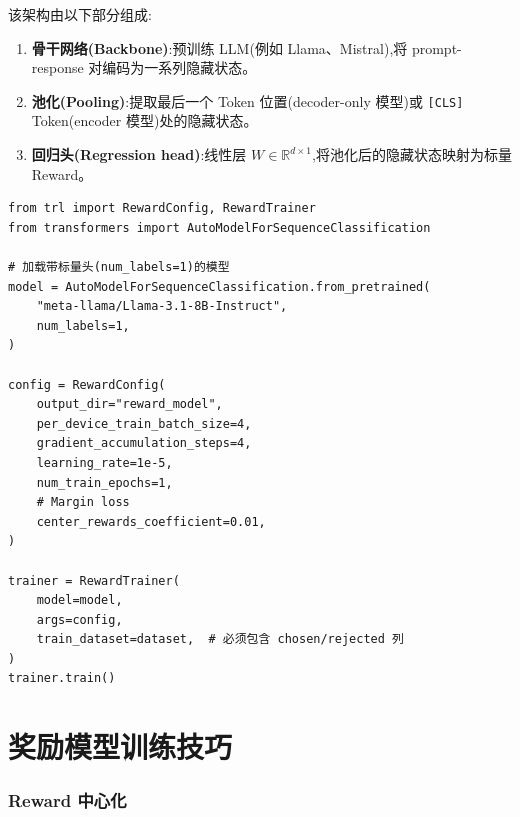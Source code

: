 该架构由以下部分组成:

\begin{enumerate}
  \item \textbf{骨干网络(Backbone)}:预训练 LLM(例如 Llama、Mistral),将 prompt-response 对编码为一系列隐藏状态。
  \item \textbf{池化(Pooling)}:提取最后一个 Token 位置(decoder-only 模型)或 \texttt{[CLS]} Token(encoder 模型)处的隐藏状态。
  \item \textbf{回归头(Regression head)}:线性层 $W \in \mathbb{R}^{d \times 1}$,将池化后的隐藏状态映射为标量 Reward。
\end{enumerate}

\begin{examplebox}
\begin{lstlisting}[style=pythonstyle]
from trl import RewardConfig, RewardTrainer
from transformers import AutoModelForSequenceClassification

# 加载带标量头(num_labels=1)的模型
model = AutoModelForSequenceClassification.from_pretrained(
    "meta-llama/Llama-3.1-8B-Instruct",
    num_labels=1,
)

config = RewardConfig(
    output_dir="reward_model",
    per_device_train_batch_size=4,
    gradient_accumulation_steps=4,
    learning_rate=1e-5,
    num_train_epochs=1,
    # Margin loss
    center_rewards_coefficient=0.01,
)

trainer = RewardTrainer(
    model=model,
    args=config,
    train_dataset=dataset,  # 必须包含 chosen/rejected 列
)
trainer.train()
\end{lstlisting}
\end{examplebox}

\section{奖励模型训练技巧}
\label{sec:rm-tricks}

\subsubsection*{Reward 中心化}
\label{reward-centering}

